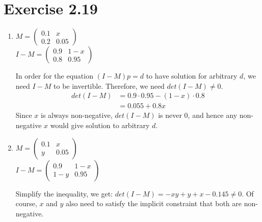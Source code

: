 \documentclass{article}
\begin{document}
\section*{Exercise 2.19}

\begin{enumerate}[label=(\alph*)]
\item $M =
\begin{pmatrix}
  0.1 & x \\
  0.2 & 0.05
\end{pmatrix}
$\\
$I-M =
\begin{pmatrix}
  0.9 & 1-x \\
  0.8 & 0.95
\end{pmatrix}
$

In order for the equation $(I-M)p = d$ to have solution for arbitrary
$d$, we need $I-M$ to be invertible. Therefore, we need $det(I-M) \neq
0$.
\begin{equation}
  \begin{split}
    det(I-M)
    &= 0.9 \cdot 0.95 - (1-x)\cdot 0.8 \\
    &= 0.055 + 0.8x
  \end{split}
\end{equation}
Since $x$ is always non-negative, $det(I-M)$ is never $0$, and hence
any non-negative $x$ would give solution to arbitrary $d$.
\item $M =
\begin{pmatrix}
  0.1 & x \\
  y & 0.05
\end{pmatrix}
$\\
$I-M =
\begin{pmatrix}
  0.9 & 1-x \\
  1-y & 0.95
\end{pmatrix}
$

Simplify the inequality, we get:
$det(I-M)= -x y+y+x-0.145 \neq 0$.
Of course, $x$ and $y$ also need to satisfy the implicit constraint
that both are non-negative.
\end{enumerate}
\end{document}
